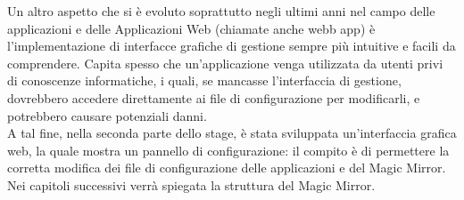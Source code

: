 Un altro aspetto che si \`e evoluto soprattutto negli ultimi anni nel campo
delle applicazioni e delle Applicazioni Web (chiamate anche webb app)
\`e l'implementazione di interfacce grafiche di gestione sempre pi\`u
intuitive e facili da comprendere. Capita spesso che un'applicazione
venga utilizzata da utenti privi di conoscenze informatiche, i quali, se mancasse
l'interfaccia di gestione, dovrebbero accedere direttamente ai file di configurazione
per modificarli, e potrebbero causare potenziali danni.\\
A tal fine, nella seconda parte dello stage,
\`e stata sviluppata un'interfaccia grafica web, la quale mostra un pannello di configurazione:
il compito \`e di permettere la corretta modifica dei file di configurazione delle applicazioni
e del Magic Mirror.
\\[2\baselineskip]
Nei capitoli successivi verr\`a spiegata la struttura del Magic Mirror.
